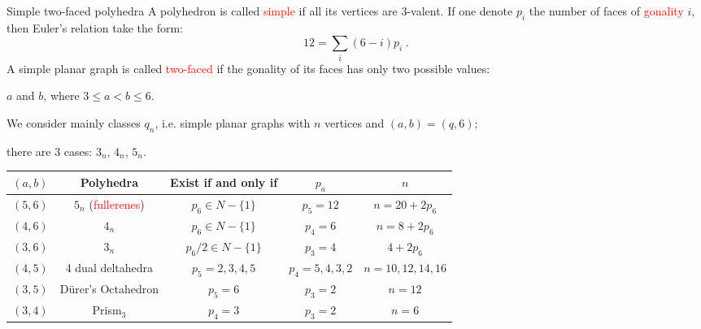 \documentclass[%
pdf,
colorBG,
slideColor,
]{prosper}
\begin{document}
\begin{slide}{Simple two-faced polyhedra}
A polyhedron is called \textcolor{red}{simple} if all its vertices are $3$-valent.
If one denote $p_i$ the number of faces of \textcolor{red}{gonality} $i$, then Euler's relation take the form:
\begin{equation*}
12=\sum_{i} (6-i) p_i\;.
\end{equation*}
A simple planar graph is called \textcolor{red}{two-faced} if the gonality of its faces has only two possible values:
\begin{center}
$a$ and $b$, where $3\leq a< b\leq 6$.
\end{center}

\vspace{3mm}

We consider mainly classes $q_n$, i.e. simple planar graphs with $n$ vertices and $(a,b)=(q,6)$; 
\begin{center}
there are $3$ cases: $3_n$, $4_n$, $5_n$.
\end{center}


\end{slide}


\begin{slide}{}
{\tiny
\begin{tabular}{||c||c|c|c|c||}
\hline
\hline
$(a,b)$ & Polyhedra & Exist if and only if & $p_a$ & $n$\\ \hline\hline
$(5,6)$ & $5_{n}$ (\textcolor{red}{fullerenes}) & $p_6\in N-\{1\}$& $p_5=12$ &$n=20+2p_6$\\ \hline
$(4,6)$ & $4_{n}$ & $p_{6} \in N-\{1\}$ & $p_4=6$ &$n=8+2p_6$\\ \hline
$(3,6)$ & $3_{n}$ & $p_{6}/2 \in N-\{1\}$ & $p_3=4$ &$4+2p_6$\\  \hline\hline
$(4,5)$ & 4 dual deltahedra & $p_5=2,3,4,5$ &$p_4=5,4,3,2$&$n=10,12,14,16$\\ \hline
$(3,5)$ & D\"urer's Octahedron & $p_5=6$ &$p_3=2$ &$n=12$\\ \hline
$(3,4)$ & Prism${}_{3}$ & $p_4=3$ & $p_3=2$ & $n=6$\\ 
\hline
\hline
\end{tabular}
}
\begin{center}
\end{center}

\vspace{-3mm}

\end{slide}
\end{document}
